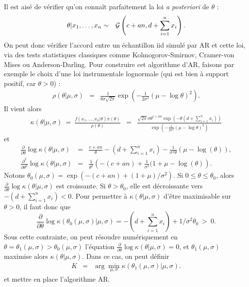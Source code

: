 \begin{rep}
Il est aisé de vérifier qu'on connaît parfaitement la loi {\it a posteriori} de $\theta$ :
\begin{eqnarray*}
\theta|x_1,\ldots,x_n %
& \sim & {\cal{G}}\left(c+an,d+\sum\limits_{i=1}^n x_i\right).
\end{eqnarray*}
On peut donc vérifier l'accord entre un échantillon iid simulé par AR et cette loi, via des tests statistiques classiques comme Kolmogorov-Smirnov, Cramer-von Mises ou Anderson-Darling. Pour construire cet algorithme d'AR, faisons par exemple le choix d'une loi instrumentale lognormale (qui est bien à support positif, car $\theta>0$) :
\begin{eqnarray*}
\rho(\theta|\mu,\sigma) & = & \frac{1}{\theta\sigma \sqrt{2\pi}} \exp\left(-\frac{1}{2\sigma^2}\left(\mu-\log\theta\right)^2\right).
\end{eqnarray*}
Il vient alors 
\begin{eqnarray*}
\kappa(\theta|\mu,\sigma)  \ = \  \frac{f(x_1,\ldots,x_n|\theta)\pi(\theta)}{\rho(\theta)} & = & {\displaystyle \frac{\sqrt{2\pi} \sigma \theta^{c+an} \exp\left(-\theta(d+\sum_{i=1}^n x_i)\right)}{\exp\left(-\frac{1}{2\sigma^2}\left(\mu-\log\theta\right)^2\right)}}
\end{eqnarray*}
et 
\begin{eqnarray*}
\frac{\partial }{\partial \theta} \log \kappa(\theta|\mu,\sigma) & = & \frac{c+an}{\theta} - \left(d+\sum\limits_{i=1}^n x_i\right) - \frac{1}{\sigma^2\theta}\left(\mu-\log(\theta)\right), \\
\frac{\partial^2 }{\partial \theta^2} \log \kappa(\theta|\mu,\sigma) & = & \frac{1}{\theta^2}\left(-(c+an) + \frac{1}{\sigma^2}(1+\mu - \log(\theta)\right).
\end{eqnarray*}
Notons $\theta_0(\mu,\sigma)=\exp(-(c+an)+(1+\mu)/\sigma^2)$. Si $0\leq \theta\leq \theta_0$, alors $\frac{\partial }{\partial \theta} \log \kappa(\theta|\mu,\sigma)$ est croissante. Si $\theta>\theta_0$, elle est décroissante vers $-(d+\sum_{i=1}^n x_i)<0$. Pour permettre à $\kappa(\theta|\mu,\sigma)$ d'être maximisable sur $\theta>0$, il faut donc que 
$$
\frac{\partial }{\partial \theta} \log \kappa(\theta_0(\mu,\sigma)|\mu,\sigma) = -\left(d+\sum\limits_{i=1}^n x_i\right) + 1/\sigma^2\theta_0 \ > \ 0.
$$
Sous cette contrainte, on peut résoudre numériquement en $\theta=\theta_1(\mu,\sigma)>\theta_0(\mu,\sigma)$ l'équation $\frac{\partial }{\partial \theta} \log \kappa(\theta|\mu,\sigma)=0$, et $\theta_1(\mu,\sigma)$ maximise alors $\kappa(\theta|\mu,\sigma)$. Dans ce cas, on peut définir 
\begin{eqnarray*}
K & = & \arg\min\limits_{\mu,\sigma} \kappa(\theta_1(\mu,\sigma)|\mu,\sigma). 
\end{eqnarray*}
et mettre en place l'algorithme AR.
\end{rep}
